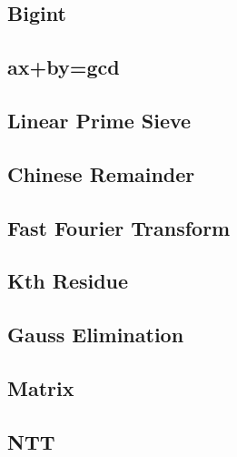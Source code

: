 \documentclass[a4paper,10pt,twocolumn,oneside]{article}
\begin{document}
\subsection{Bigint}


\subsection{ax+by=gcd}


\subsection{Linear Prime Sieve}


% 

\subsection{Chinese Remainder}


\subsection{Fast Fourier Transform}


\subsection{Kth Residue}


\subsection{Gauss Elimination}


\subsection{Matrix}


\subsection{NTT}

\end{document}
